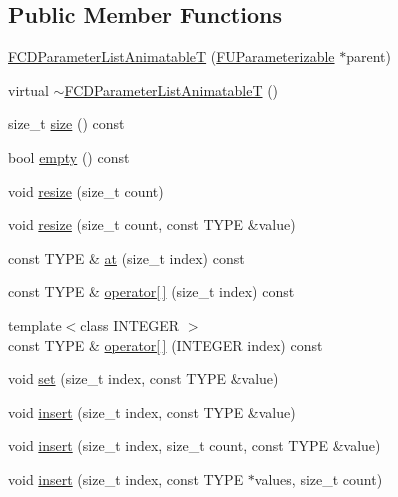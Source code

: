 \subsection*{Public Member Functions}
\begin{DoxyCompactItemize}
\item 
\hyperlink{classFCDParameterListAnimatableT_a0b81b992f2f835a8bfaa23b0ea9589dc}{FCDParameterListAnimatableT} (\hyperlink{classFUParameterizable}{FUParameterizable} $\ast$parent)
\item 
virtual \hyperlink{classFCDParameterListAnimatableT_a9f4a5b8c5d2536ec3ec0cccfa2fb3687}{$\sim$FCDParameterListAnimatableT} ()
\item 
size\_\-t \hyperlink{classFCDParameterListAnimatableT_aceb730c119e53c20a664133fe961ab8b}{size} () const 
\item 
bool \hyperlink{classFCDParameterListAnimatableT_a71f7283cf83699a3f00873a1ab0927ad}{empty} () const 
\item 
void \hyperlink{classFCDParameterListAnimatableT_a50217beea0b043f5ef0869287323ce20}{resize} (size\_\-t count)
\item 
void \hyperlink{classFCDParameterListAnimatableT_a46d7428f7b57de9529d67d25a7a83446}{resize} (size\_\-t count, const TYPE \&value)
\item 
const TYPE \& \hyperlink{classFCDParameterListAnimatableT_a5e20c8fe2386cdf03c1ba080d2ff6ce4}{at} (size\_\-t index) const 
\item 
const TYPE \& \hyperlink{classFCDParameterListAnimatableT_aca268c9026fc969b02489ebc0c61bd08}{operator\mbox{[}$\,$\mbox{]}} (size\_\-t index) const 
\item 
{\footnotesize template$<$class INTEGER $>$ }\\const TYPE \& \hyperlink{classFCDParameterListAnimatableT_a8cd9ee7a5a35e5f121623343101b178f}{operator\mbox{[}$\,$\mbox{]}} (INTEGER index) const 
\item 
void \hyperlink{classFCDParameterListAnimatableT_a3d828e2bda21011e7712083516a9e5fa}{set} (size\_\-t index, const TYPE \&value)
\item 
void \hyperlink{classFCDParameterListAnimatableT_a79ff7af7dea1c7b3228f2a91c6673228}{insert} (size\_\-t index, const TYPE \&value)
\item 
void \hyperlink{classFCDParameterListAnimatableT_ac883eddf811c3e28e6c3d3000927f114}{insert} (size\_\-t index, size\_\-t count, const TYPE \&value)
\item 
void \hyperlink{classFCDParameterListAnimatableT_a24b5749b54759b60073116c1dfac5a09}{insert} (size\_\-t index, const TYPE $\ast$values, size\_\-t count)

\end{DoxyCompactItemize}
